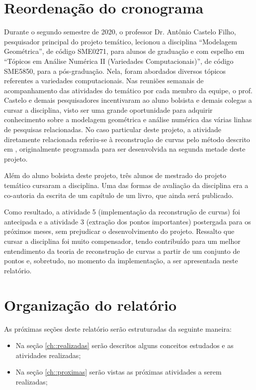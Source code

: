 \section{Reordenação do cronograma}\label{sec::reordenacao}

Durante o segundo semestre de 2020, o professor Dr. Antônio Castelo Filho, pesquisador principal do projeto temático, lecionou a disciplina ``Modelagem Geométrica'', de código SME0271, para alunos de graduação e com espelho em ``Tópicos em Análise Numérica II (Variedades Computacionais)'', de código SME5850, para a pós-graduação. Nela, foram abordados diversos tópicos referentes a variedades computacionais. Nas reuniões semanais de acompanhamento das atividades do temático por cada membro da equipe,  o prof. Castelo e demais pesquisadores incentivaram ao aluno bolsista e demais colegas a cursar a disciplina, visto ser uma grande oportunidade para adquirir conhecimento sobre a modelagem geométrica e análise numérica das várias linhas de pesquisas relacionadas. No caso particular deste projeto, a atividade diretamente relacionada referiu-se à reconstrução de curvas pelo método descrito em , originalmente programada para ser desenvolvida na segunda metade deste projeto. 

Além do aluno bolsista deste projeto, três alunos de mestrado do projeto temático cursaram a disciplina. Uma das formas de avaliação da disciplina era a co-autoria da escrita de um capítulo de um livro, que ainda será publicado.

Como resultado, a atividade 5 (implementação da reconstrução de curvas) foi antecipada e a atividade 3 (extração dos pontos importantes) postergada para os próximos meses, sem prejudicar o desenvolvimento do projeto. Ressalto que cursar a disciplina foi muito compensador, tendo contribuído para um melhor entendimento da teoria de reconstrução de curvas a partir de um conjunto de pontos e, sobretudo, no momento da implementação, a ser apresentada neste relatório.

\section{Organização do relatório}

As próximas seções deste relatório serão estruturadas da seguinte maneira:

\begin{itemize}[noitemsep]
	\item Na seção \ref{ch::realizadas} serão descritos alguns conceitos estudados e as atividades realizadas;
	\item Na seção \ref{ch::proximas} serão vistas as próximas atividades a serem realizadas;
\end{itemize}